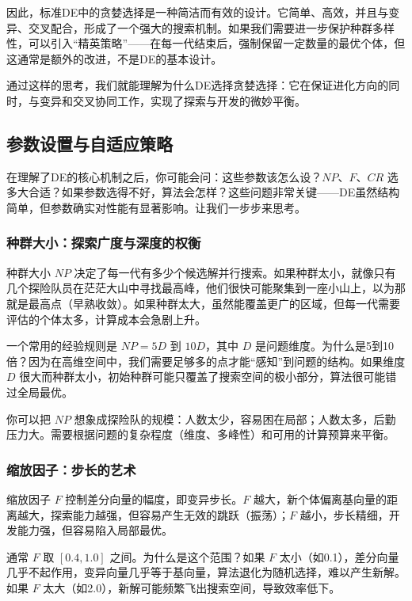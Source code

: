\documentclass[lang=cn,zihao=-4,a4paper,fontset=windows]{beautybook}
\begin{document}
因此，标准DE中的贪婪选择是一种简洁而有效的设计。它简单、高效，并且与变异、交叉配合，形成了一个强大的搜索机制。如果我们需要进一步保护种群多样性，可以引入“精英策略”——在每一代结束后，强制保留一定数量的最优个体，但这通常是额外的改进，不是DE的基本设计。

通过这样的思考，我们就能理解为什么DE选择贪婪选择：它在保证进化方向的同时，与变异和交叉协同工作，实现了探索与开发的微妙平衡。

\subsection{参数设置与自适应策略}

在理解了DE的核心机制之后，你可能会问：这些参数该怎么设？$NP$、$F$、$CR$ 选多大合适？如果参数选得不好，算法会怎样？这些问题非常关键——DE虽然结构简单，但参数确实对性能有显著影响。让我们一步步来思考。

\subsubsection{种群大小：探索广度与深度的权衡}

种群大小 $NP$ 决定了每一代有多少个候选解并行搜索。如果种群太小，就像只有几个探险队员在茫茫大山中寻找最高峰，他们很快可能聚集到一座小山上，以为那就是最高点（早熟收敛）。如果种群太大，虽然能覆盖更广的区域，但每一代需要评估的个体太多，计算成本会急剧上升。

一个常用的经验规则是 $NP = 5D$ 到 $10D$，其中 $D$ 是问题维度。为什么是5到10倍？因为在高维空间中，我们需要足够多的点才能“感知”到问题的结构。如果维度 $D$ 很大而种群太小，初始种群可能只覆盖了搜索空间的极小部分，算法很可能错过全局最优。

你可以把 $NP$ 想象成探险队的规模：人数太少，容易困在局部；人数太多，后勤压力大。需要根据问题的复杂程度（维度、多峰性）和可用的计算预算来平衡。

\subsubsection{缩放因子：步长的艺术}

缩放因子 $F$ 控制差分向量的幅度，即变异步长。$F$ 越大，新个体偏离基向量的距离越大，探索能力越强，但容易产生无效的跳跃（振荡）；$F$ 越小，步长精细，开发能力强，但容易陷入局部最优。

通常 $F$ 取 $[0.4, 1.0]$ 之间。为什么是这个范围？如果 $F$ 太小（如0.1），差分向量几乎不起作用，变异向量几乎等于基向量，算法退化为随机选择，难以产生新解。如果 $F$ 太大（如2.0），新解可能频繁飞出搜索空间，导致效率低下。
\end{document}
